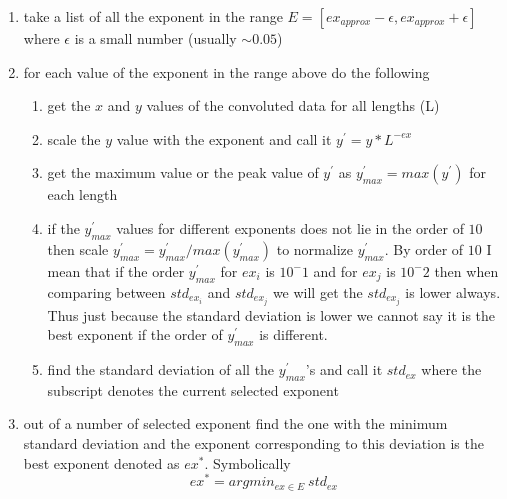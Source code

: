 		\begin{enumerate}
			\item take a list of all the exponent in the range $E = [ex_{approx}-\epsilon, ex_{approx}+\epsilon]$ where $\epsilon$ is a small number (usually $\sim 0.05$)
			\item for each value of the exponent in the range above do the following
			\begin{enumerate}
				\item get the $x$ and $y$ values of the convoluted data for all lengths (L)
				\item scale the $y$ value with the exponent and call it $y^{\prime} = y*L^{-ex}$
				\item get the maximum value or the peak value of $y^{\prime}$ as $y^{\prime}_{max}=max(y^{\prime})$ for each length
				\item if the $y^{\prime}_{max}$ values for different exponents does not lie in the order of $10$ then scale $y^{\prime}_{max} = y^{\prime}_{max} / max(y^{\prime}_{max})$ to normalize $y^{\prime}_{max}$. By order of $10$ I mean that if the order $y^{\prime}_{max}$ for $ex_i$ is $10^-1$ and for $ex_j$ is $10^-2$ then when comparing between $std_{ex_i}$ and $std_{ex_j}$ we will get the $std_{ex_j}$ is lower always. Thus just because the standard deviation is lower we cannot say it is the best exponent if the order of  $y^{\prime}_{max}$ is different.
				\item find the standard deviation of all the $y^{\prime}_{max}$'s and call it $std_{ex}$ where the subscript denotes the current selected exponent
			\end{enumerate}
			\item out of a number of selected exponent find the one with the minimum standard deviation and the exponent corresponding to this deviation is the best exponent denoted as $ex^*$. Symbolically
			\begin{equation}
				ex^* = argmin_{ex \in E}\ std_{ex}
			\end{equation}
		\end{enumerate}
